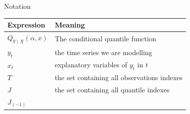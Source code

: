\begin{frame}{Notation}

\small

\begin{longtable}[]{@{}ll@{}}
\toprule
\begin{minipage}[b]{0.14\columnwidth}\raggedright\strut
Expression\strut
\end{minipage} & \begin{minipage}[b]{0.80\columnwidth}\raggedright\strut
Meaning\strut
\end{minipage}\tabularnewline
\midrule
\endhead
\begin{minipage}[t]{0.14\columnwidth}\raggedright\strut
\(Q_{Y \mid X}(\alpha,x)\)\strut
\end{minipage} & \begin{minipage}[t]{0.80\columnwidth}\raggedright\strut
The conditional quantile function\strut
\end{minipage}\tabularnewline
\begin{minipage}[t]{0.14\columnwidth}\raggedright\strut
\(y_t\)\strut
\end{minipage} & \begin{minipage}[t]{0.80\columnwidth}\raggedright\strut
the time series we are modelling\strut
\end{minipage}\tabularnewline
\begin{minipage}[t]{0.14\columnwidth}\raggedright\strut
\(x_t\)\strut
\end{minipage} & \begin{minipage}[t]{0.80\columnwidth}\raggedright\strut
explanatory variables of \(y_t\) in \(t\)\strut
\end{minipage}\tabularnewline
\begin{minipage}[t]{0.14\columnwidth}\raggedright\strut
\(T\)\strut
\end{minipage} & \begin{minipage}[t]{0.80\columnwidth}\raggedright\strut
the set containing all observations indexes\strut
\end{minipage}\tabularnewline
\begin{minipage}[t]{0.14\columnwidth}\raggedright\strut
\(J\)\strut
\end{minipage} & \begin{minipage}[t]{0.80\columnwidth}\raggedright\strut
the set containing all quantile indexes\strut
\end{minipage}\tabularnewline
\begin{minipage}[t]{0.14\columnwidth}\raggedright\strut
\(J_{(-1)}\)\strut

\end{minipage}
\end{longtable}
\end{frame}
